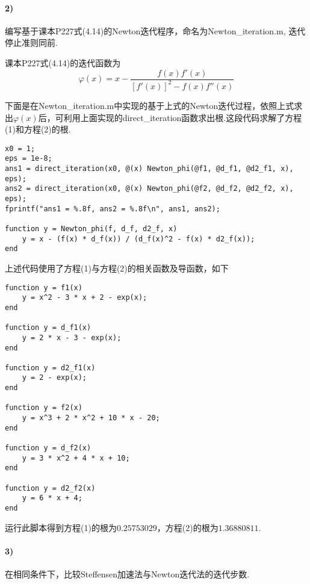 \paragraph{2)} 编写基于课本P227式(4.14)的Newton迭代程序，命名为Newton\_iteration.m, 迭代停止准则同前.
\par 课本P227式(4.14)的迭代函数为
\[\varphi(x) = x - \frac{f(x)f'(x)}{[f'(x)]^2 - f(x)f''(x)}\]
\par 下面是在Newton\_iteration.m中实现的基于上式的Newton迭代过程，依照上式求出$\varphi(x)$后，可利用上面实现的direct\_iteration函数求出根.这段代码求解了方程(1)和方程(2)的根.
\begin{lstlisting}
x0 = 1;
eps = 1e-8;
ans1 = direct_iteration(x0, @(x) Newton_phi(@f1, @d_f1, @d2_f1, x), eps);
ans2 = direct_iteration(x0, @(x) Newton_phi(@f2, @d_f2, @d2_f2, x), eps);
fprintf("ans1 = %.8f, ans2 = %.8f\n", ans1, ans2);

function y = Newton_phi(f, d_f, d2_f, x)
    y = x - (f(x) * d_f(x)) / (d_f(x)^2 - f(x) * d2_f(x)); 
end
\end{lstlisting}
上述代码使用了方程(1)与方程(2)的相关函数及导函数，如下
\begin{lstlisting}
function y = f1(x)
    y = x^2 - 3 * x + 2 - exp(x);
end

function y = d_f1(x)
    y = 2 * x - 3 - exp(x);
end

function y = d2_f1(x)
    y = 2 - exp(x);
end

function y = f2(x)
    y = x^3 + 2 * x^2 + 10 * x - 20; 
end

function y = d_f2(x)
    y = 3 * x^2 + 4 * x + 10;
end

function y = d2_f2(x)
    y = 6 * x + 4;
end
\end{lstlisting}
\par 运行此脚本得到方程(1)的根为$0.25753029$，方程(2)的根为$1.36880811$.

\paragraph{3)} 在相同条件下，比较Steffensen加速法与Newton迭代法的迭代步数.
